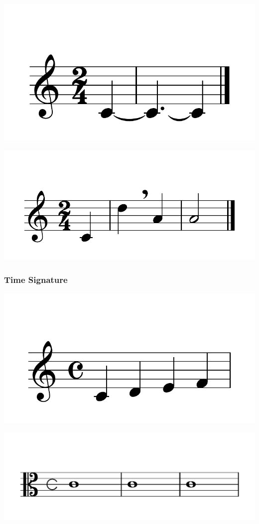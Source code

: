 \documentclass{article}
\begin{document}
\includegraphics[scale=0.5]{figures_tests/pdf/skern/ties2.pdf}

\includegraphics[scale=0.5]{figures_tests/pdf/skern/ties3.pdf}

\subsubsection{Time Signature}
\includegraphics[scale=0.5]{figures_tests/pdf/skern/timesignature.pdf}

\includegraphics[scale=0.5]{figures_tests/pdf/skern/timesignature1.pdf}
\end{document}
